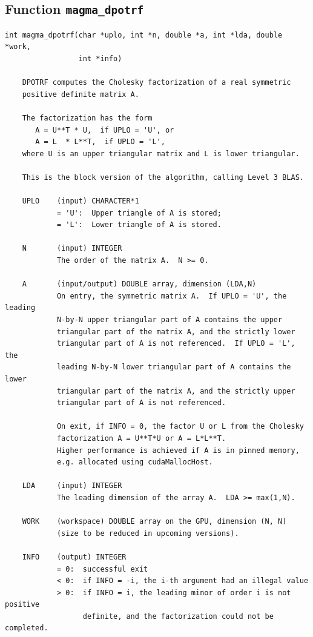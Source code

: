 \documentclass[10pt]{book}
\begin{document}
\subsection{Function {\tt {\bf magma\_dpotrf}}}
\begin{verbatim}
int magma_dpotrf(char *uplo, int *n, double *a, int *lda, double *work, 
                 int *info)
   
    DPOTRF computes the Cholesky factorization of a real symmetric   
    positive definite matrix A.   

    The factorization has the form   
       A = U**T * U,  if UPLO = 'U', or   
       A = L  * L**T,  if UPLO = 'L',   
    where U is an upper triangular matrix and L is lower triangular.   

    This is the block version of the algorithm, calling Level 3 BLAS.   

    UPLO    (input) CHARACTER*1   
            = 'U':  Upper triangle of A is stored;   
            = 'L':  Lower triangle of A is stored.   

    N       (input) INTEGER   
            The order of the matrix A.  N >= 0.   

    A       (input/output) DOUBLE array, dimension (LDA,N)   
            On entry, the symmetric matrix A.  If UPLO = 'U', the leading   
            N-by-N upper triangular part of A contains the upper   
            triangular part of the matrix A, and the strictly lower   
            triangular part of A is not referenced.  If UPLO = 'L', the   
            leading N-by-N lower triangular part of A contains the lower   
            triangular part of the matrix A, and the strictly upper   
            triangular part of A is not referenced.   

            On exit, if INFO = 0, the factor U or L from the Cholesky   
            factorization A = U**T*U or A = L*L**T.   
            Higher performance is achieved if A is in pinned memory,
            e.g. allocated using cudaMallocHost.

    LDA     (input) INTEGER   
            The leading dimension of the array A.  LDA >= max(1,N).   

    WORK    (workspace) DOUBLE array on the GPU, dimension (N, N)
            (size to be reduced in upcoming versions).

    INFO    (output) INTEGER   
            = 0:  successful exit   
            < 0:  if INFO = -i, the i-th argument had an illegal value   
            > 0:  if INFO = i, the leading minor of order i is not positive 
                  definite, and the factorization could not be completed.   
\end{verbatim}
\end{document}
